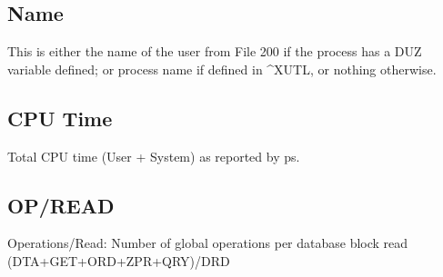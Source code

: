 \documentclass[]{article}
\begin{document}
\begin{multicols}{2}
\subsection{Name}
This is either the name of the user from File 200 if the process has a DUZ variable defined; or process name if defined in \^{}XUTL, or nothing otherwise.

\subsection{CPU Time}
Total CPU time (User + System) as reported by ps.

\subsection{OP/READ}
Operations/Read: Number of global operations per database block read (DTA+GET+ORD+ZPR+QRY)/DRD

\end{multicols}
\end{document}
